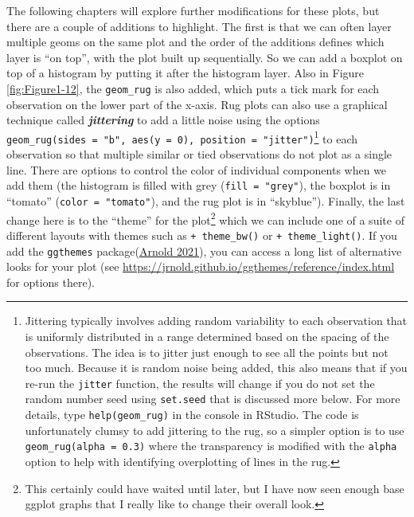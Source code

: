 \documentclass[
]{book}
\begin{document}
\indent The following chapters will explore further modifications for these
plots, but there are a couple of additions to highlight. The first is that we
can often layer multiple geoms on the same plot and the order of the additions
defines which layer is ``on top'', with the plot built up sequentially. So we can
add a boxplot on top of a histogram by putting it after the histogram layer.
Also in Figure \ref{fig:Figure1-12}, the \texttt{geom\_rug} is also added, which puts
a tick mark for each observation on the lower part of the x-axis. 
Rug plots can also use a graphical technique called \textbf{\emph{jittering}} to add a little
noise using the options \texttt{geom\_rug(sides\ =\ "b",\ aes(y\ =\ 0),\ position\ =\ "jitter")}\footnote{Jittering typically involves adding random variability to each
  observation that is uniformly distributed in a range determined based on the
  spacing of the observations. The idea is to jitter just enough to see all the
  points but not too much. Because it is random noise being added, this also means that if you re-run the \texttt{jitter} function,
  the results will change if you do not set the random number seed using
  \texttt{set.seed} that is discussed more below. For more details, type \texttt{help(geom\_rug)}
  in the console in RStudio. The code is unfortunately clumsy to add jittering to the rug, so a simpler option is to use \texttt{geom\_rug(alpha\ =\ 0.3)} where the transparency is modified with the \texttt{alpha} option to help with identifying overplotting of lines in the rug.} to each observation so that multiple similar or
tied observations do not plot as a single line.  There are options
to control the color of individual components when we add them (the histogram is
filled with grey (\texttt{fill\ =\ "grey"}), the boxplot is in ``tomato''
(\texttt{color\ =\ "tomato"}), and the rug plot is in ``skyblue''). Finally, the last
change here is to the ``theme'' for the plot\footnote{This certainly could have waited
  until later, but I have now seen enough base ggplot graphs that I really like
  to change their overall look.} which we can include one of a suite of different
layouts with themes such as \texttt{+\ theme\_bw()} or \texttt{+\ theme\_light()}. If you add the
\texttt{ggthemes} package(\protect\hyperlink{ref-R-ggthemes}{Arnold 2021}), you can access a long list of alternative looks
for your plot (see \url{https://jrnold.github.io/ggthemes/reference/index.html} for
options there).  
\end{document}
